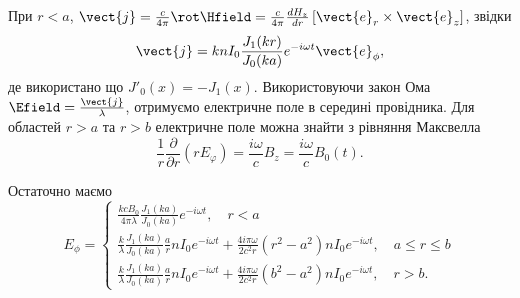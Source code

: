 \begin{problem}
\begin{solution}
	При $r < a$, $\vect{j} = \frac{c}{4\pi}\rot\Hfield = \frac{c}{4\pi}\frac{d{H_z}}{dr}\left[ \vect{e}_r \times \vect{e}_z \right]$, звідки
	\[
		\vect{j} = knI_0\frac{J_1(kr)}{J_0(ka)}e^{-i\omega t}\vect{e}_{\phi},
	\]
	де використано що $J'_0(x) = -J_1(x)$. Використовуючи закон Ома $\Efield = \frac{\vect{j}}{\lambda}$, отримуємо електричне поле в середині провідника.
	Для областей $r >a$ та $r >b$ електричне поле можна знайти з рівняння Максвелла
	\[
		\frac{1}{r}\frac{\partial }{{\partial r}}\left( {r{E_\varphi }} \right) = \frac{{i\omega }}{c}{B_z} = \frac{{i\omega }}{c}{B_0}(t).
	\]

	Остаточно маємо
	\[
		E_{\phi} =
		\begin{cases}
			\frac{kcB_0}{4\pi\lambda}\frac{J_1(ka)}{J_0(ka)}e^{-i\omega t}, \quad r <a                                                                                        \\
			\frac{k}{\lambda}\frac{J_1(ka)}{J_0(ka)}\frac{a}{r}nI_0e^{-i\omega t} + \frac{4i\pi\omega }{2c^2r}\left( r^2 - a^2\right) nI_0e^{-i\omega t}, \quad a \le r \le b \\
			\frac{k}{\lambda}\frac{J_1(ka)}{J_0(ka)}\frac{a}{r}nI_0e^{-i\omega t} + \frac{4i\pi\omega }{2c^2r}\left( b^2 - a^2\right)nI_0e^{-i\omega t} , \quad r > b.
		\end{cases}
	\]
\end{solution}
\end{problem}


